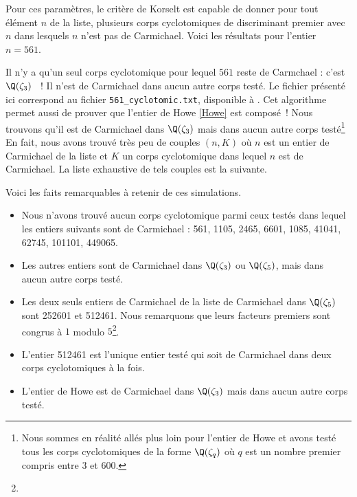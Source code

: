 Pour ces paramètres, le critère de Korselt est capable de donner pour tout élément $n$ de la liste, plusieurs corps cyclotomiques de discriminant premier avec $n$ dans lesquels $n$ n'est pas de Carmichael. Voici les résultats pour l'entier $n = 561$.

\vspace{1em}

Il n'y a qu'un seul corps cyclotomique pour lequel $561$ reste de Carmchael : c'est $\Q(\zeta_3)$ ~! Il n'est de Carmichael dans aucun autre corps testé. Le fichier présenté ici correspond au fichier \texttt{561\_cyclotomic.txt}, disponible à . Cet algorithme permet aussi de prouver que l'entier de Howe \ref{Howe} est composé~! Nous trouvons qu'il est de Carmichael dans $\Q(\zeta_3)$ mais dans aucun autre corps testé\footnote{Nous sommes en réalité allés plus loin pour l'entier de Howe et avons testé tous les corps cyclotomiques de la forme $\Q(\zeta_q)$ où $q$ est un nombre premier compris entre $3$ et $600$.} En fait, nous avons trouvé très peu de couples $(n, K)$ où $n$ est un entier de Carmichael de la liste et $K$ un corps cyclotomique dans lequel $n$ est de Carmichael. La liste exhaustive de tels couples est la suivante.

\vspace{1em}

Voici les faits remarquables à retenir de ces simulations.
	\begin{itemize}
		\item Nous n'avons trouvé aucun corps cyclotomique parmi ceux testés dans lequel les entiers suivants sont de Carmichael : 561, 1105, 2465, 6601, 1085, 41041, 62745, 101101, 449065.
		\item Les autres entiers sont de Carmichael dans $\Q(\zeta_3)$ ou $\Q(\zeta_5)$, mais dans aucun autre corps testé.
		\item Les deux seuls entiers de Carmichael de la liste de Carmichael dans $\Q(\zeta_5)$ sont 252601 et 512461. Nous remarquons que leurs facteurs premiers sont congrus à $1$ modulo $5$\footnote{}.
		\item L'entier 512461 est l'unique entier testé qui soit de Carmichael dans deux corps cyclotomiques à la fois.
		\item L'entier de Howe est de Carmichael dans $\Q(\zeta_3)$ mais dans aucun autre corps testé.
	\end{itemize}

